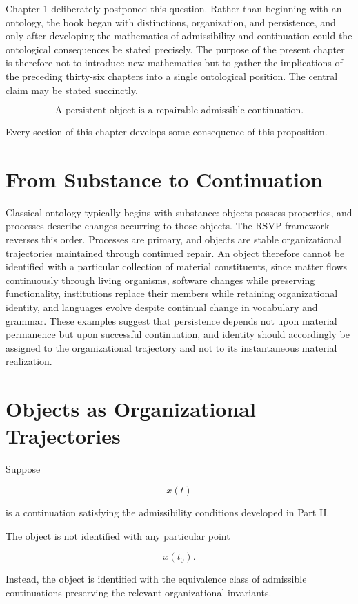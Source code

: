 \documentclass[11pt,oneside]{book}
\numberwithin{equation}{chapter}
\theoremstyle{definition}
\theoremstyle{plain}
\begin{document}
Chapter 1 deliberately postponed this question. Rather than beginning with an ontology, the book began with distinctions, organization, and persistence, and only after developing the mathematics of admissibility and continuation could the ontological consequences be stated precisely. The purpose of the present chapter is therefore not to introduce new mathematics but to gather the implications of the preceding thirty-six chapters into a single ontological position. The central claim may be stated succinctly.

\[
\boxed{
\text{A persistent object is a repairable admissible continuation.}
}
\]

Every section of this chapter develops some consequence of this
proposition.

\section{From Substance to Continuation}

Classical ontology typically begins with substance: objects possess properties, and processes describe changes occurring to those objects. The RSVP framework reverses this order. Processes are primary, and objects are stable organizational trajectories maintained through continued repair. An object therefore cannot be identified with a particular collection of material constituents, since matter flows continuously through living organisms, software changes while preserving functionality, institutions replace their members while retaining organizational identity, and languages evolve despite continual change in vocabulary and grammar. These examples suggest that persistence depends not upon material permanence but upon successful continuation, and identity should accordingly be assigned to the organizational trajectory and not to its instantaneous material realization.

\section{Objects as Organizational Trajectories}

Suppose

\[
x(t)
\]

is a continuation satisfying the admissibility conditions developed in Part
II.

The object is not identified with any particular point

\[
x(t_0).
\]

Instead, the object is identified with the equivalence class of admissible
continuations preserving the relevant organizational invariants.
\end{document}
